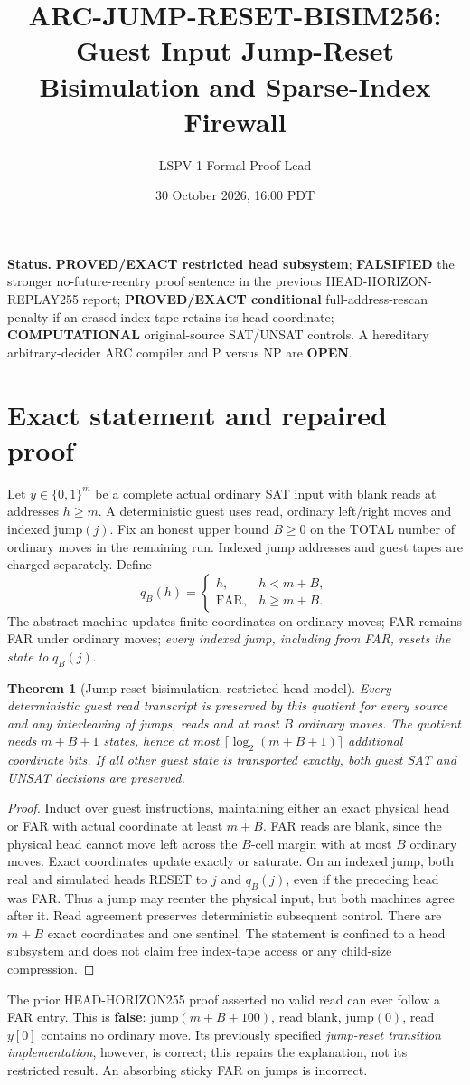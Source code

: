 \documentclass[10pt]{article}
\title{ARC-JUMP-RESET-BISIM256: Guest Input Jump-Reset Bisimulation and Sparse-Index Firewall}
\author{LSPV-1 Formal Proof Lead}
\date{30 October 2026, 16:00 PDT}
\newtheorem{theorem}{Theorem}
\begin{document}
\maketitle
\noindent\textbf{Status.} \textbf{PROVED/EXACT restricted head subsystem}; \textbf{FALSIFIED} the stronger no-future-reentry proof sentence in the previous HEAD-HORIZON-REPLAY255 report; \textbf{PROVED/EXACT conditional} full-address-rescan penalty if an erased index tape retains its head coordinate; \textbf{COMPUTATIONAL} original-source SAT/UNSAT controls. A hereditary arbitrary-decider ARC compiler and P versus NP are \textbf{OPEN}.

\section{Exact statement and repaired proof}
Let $y\in\{0,1\}^m$ be a complete actual ordinary SAT input with blank reads at addresses $h\ge m$. A deterministic guest uses read, ordinary left/right moves and indexed jump$(j)$. Fix an honest upper bound $B\ge0$ on the TOTAL number of ordinary moves in the remaining run. Indexed jump addresses and guest tapes are charged separately. Define
\[
q_B(h)=\begin{cases}h,&h<m+B,\\\mathrm{FAR},&h\ge m+B.\end{cases}
\]
The abstract machine updates finite coordinates on ordinary moves; FAR remains FAR under ordinary moves; \emph{every indexed jump, including from FAR, resets the state to} $q_B(j)$.
\begin{theorem}[Jump-reset bisimulation, restricted head model]
Every deterministic guest read transcript is preserved by this quotient for every source and any interleaving of jumps, reads and at most $B$ ordinary moves. The quotient needs $m+B+1$ states, hence at most $\lceil\log_2(m+B+1)\rceil$ additional coordinate bits. If all other guest state is transported exactly, both guest SAT and UNSAT decisions are preserved.
\end{theorem}
\begin{proof}
Induct over guest instructions, maintaining either an exact physical head or FAR with actual coordinate at least $m+B$. FAR reads are blank, since the physical head cannot move left across the $B$-cell margin with at most $B$ ordinary moves. Exact coordinates update exactly or saturate. On an indexed jump, both real and simulated heads RESET to $j$ and $q_B(j)$, even if the preceding head was FAR. Thus a jump may reenter the physical input, but both machines agree after it. Read agreement preserves deterministic subsequent control. There are $m+B$ exact coordinates and one sentinel. The statement is confined to a head subsystem and does not claim free index-tape access or any child-size compression.
\end{proof}
The prior HEAD-HORIZON255 proof asserted no valid read can ever follow a FAR entry. This is \textbf{false}: jump$(m+B+100)$, read blank, jump$(0)$, read $y[0]$ contains no ordinary move. Its previously specified \emph{jump-reset transition implementation}, however, is correct; this repairs the explanation, not its restricted result. An absorbing sticky FAR on jumps is incorrect.
\end{document}
